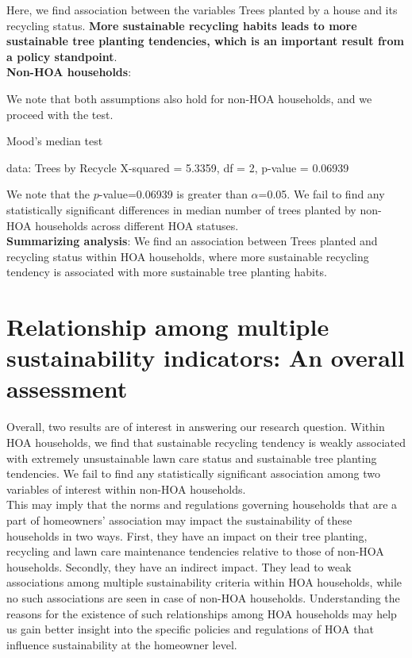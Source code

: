 \documentclass{article}
\begin{document}
Here, we find association between the variables Trees planted by a house and its recycling status. \textbf{More sustainable recycling habits leads to more sustainable tree planting tendencies, which is an important result from a policy standpoint}.\\

\textbf{Non-HOA households}:

We note that both assumptions also hold for non-HOA households, and we proceed with the test.

\begin{Schunk}
\begin{Soutput}
	Mood's median test

data:  Trees by Recycle
X-squared = 5.3359, df = 2, p-value = 0.06939
\end{Soutput}
\end{Schunk}

We note that the $p$-value=0.06939 is greater than $\alpha$=0.05. We fail to find any statistically significant differences in median number of trees planted by non-HOA households across different HOA statuses.\\

\textbf{Summarizing analysis}: We find an association between Trees planted and recycling status within HOA households, where more sustainable recycling tendency is associated with more sustainable tree planting habits.\\

\section*{Relationship among multiple sustainability indicators: An overall assessment}

Overall, two results are of interest in answering our research question. Within HOA households, we find that sustainable recycling tendency is weakly associated with extremely unsustainable lawn care status and sustainable tree planting tendencies. We fail to find any statistically significant association among two variables of interest within non-HOA households. \\

This may imply that the norms and regulations governing households that are a part of homeowners' association may impact the sustainability of these households in two ways. First, they have an impact on their tree planting, recycling and lawn care maintenance tendencies relative to those of non-HOA households. Secondly, they have an indirect impact. They lead to weak associations among multiple sustainability criteria within HOA households, while no such associations are seen in case of non-HOA households. Understanding the reasons for the existence of such relationships among HOA households may help us gain better insight into the specific policies and regulations of HOA that influence sustainability at the homeowner level.\\
\end{document}
